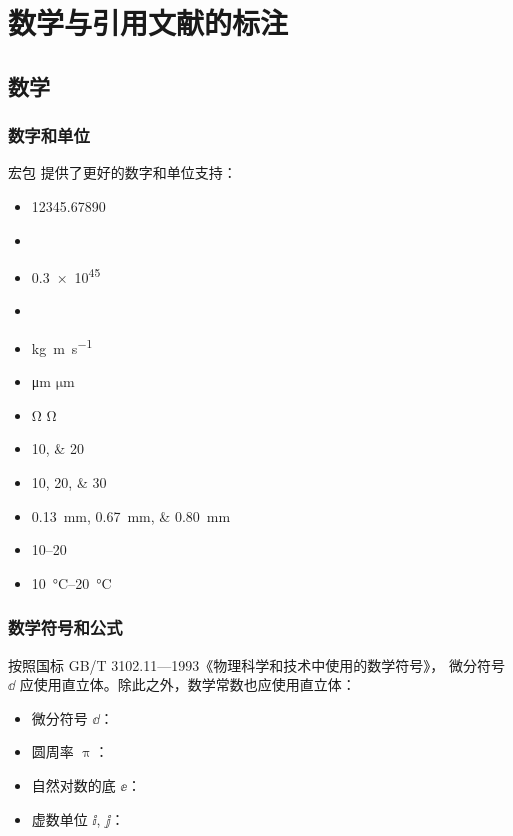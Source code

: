 
\chapter{数学与引用文献的标注}

\section{数学}

\subsection{数字和单位}

宏包  提供了更好的数字和单位支持：
\begin{itemize}
  \item \num{12345.67890}
  \item {}
  \item \num{.3e45}
  \item {}
  \item \unit{kg.m.s^{-1}}
  \item \unit{\micro\meter} $\unit{\micro\meter}$
  \item \unit{\ohm} $\unit{\ohm}$
  \item \numlist{10;20}
  \item \numlist{10;20;30}
  \item \qtylist{0.13;0.67;0.80}{\milli\metre}
  \item \numrange{10}{20}
  \item \qtyrange{10}{20}{\degreeCelsius}
\end{itemize}

\subsection{数学符号和公式}

按照国标 GB/T 3102.11—1993《物理科学和技术中使用的数学符号》，
微分符号 $\dd$ 应使用直立体。除此之外，数学常数也应使用直立体：
\begin{itemize}
  \item 微分符号 $\dd$：
  \item 圆周率 $\uppi$：
  \item 自然对数的底 $\ee$：
  \item 虚数单位 $\ii$, $\jj$： 
\end{itemize}

